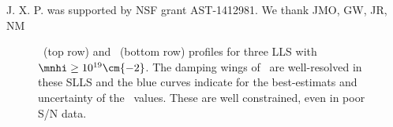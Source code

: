 \documentclass[12pt,preprint]{aastex}
\begin{document}
\acknowledgments

J. X. P. was supported by NSF grant AST-1412981.
We thank JMO, GW, JR, NM





%
%



\begin{figure}
\caption{ \lya\ (top row) and \lyb\ (bottom row)
  profiles for three LLS with $\mnhi
  \ge 10^{19} \cm{-2}$.  The damping wings of \lya\ are well-resolved
  in these SLLS and the blue curves indicate for the best-estimats and
  uncertainty of the \nhi\ values.  
  These are well constrained, even in poor S/N data.
}
\label{fig:HI_SLLS}
\end{figure}
\end{document}
